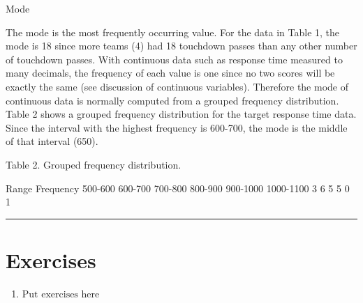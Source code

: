 \documentclass[
]{book}
\providecommand{\tightlist}{%
  \setlength{\itemsep}{0pt}\setlength{\parskip}{0pt}}
\begin{document}
Mode

The mode is the most frequently occurring value. For the data in Table 1, the mode is 18 since more teams (4) had 18 touchdown passes than any other number of touchdown passes. With continuous data such as response time measured to many decimals, the frequency of each value is one since no two scores will be exactly the same (see discussion of continuous variables). Therefore the mode of continuous data is normally computed from a grouped frequency distribution. Table 2 shows a grouped frequency distribution for the target response time data. Since the interval with the highest frequency is 600-700, the mode is the middle of that interval (650).

Table 2. Grouped frequency distribution.

Range Frequency
500-600
600-700
700-800
800-900
900-1000
1000-1100 3
6
5
5
0
1

\begin{center}\rule{0.5\linewidth}{0.5pt}\end{center}

\hypertarget{exercises-7}{%
\section{Exercises}\label{exercises-7}}

\begin{enumerate}
\def\labelenumi{\arabic{enumi}.}
\tightlist
\item
  \(\text{Put exercises here}\)
\end{enumerate}

  
\end{document}
